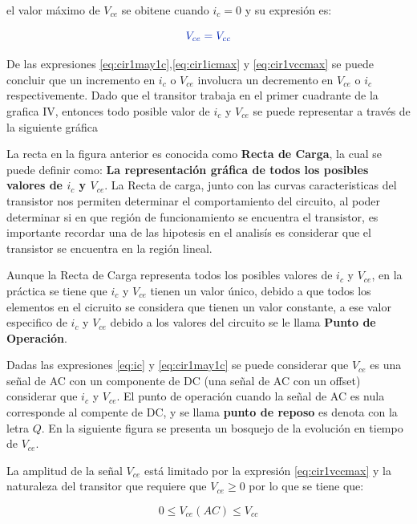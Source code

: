 \documentclass{article}
\begin{document}
el valor máximo de $V_{ce}$ se obitene cuando $i_{c}=0$ y su expresión
es:

\begin{equation}\label{eq:cir1vccmax}
\color{blue}{V_{ce}=V_{cc}}
\end{equation}

De las expresiones \eqref{eq:cir1may1c},\eqref{eq:cir1icmax} y
\eqref{eq:cir1vccmax} se puede concluir que un incremento en $i_{c}$ o
$V_{ce}$ involucra un decremento en $V_{ce}$ o $i_{c}$ respectivemente.
Dado que el transitor trabaja en el primer cuadrante de la grafica IV,
entonces todo posible valor de $i_{c}$ y $V_{ce}$ se puede representar a
través de la siguiente gráfica

La recta en la figura anterior es conocida como \textbf{Recta de Carga},
la cual se puede definir como: \textbf{La representación gráfica de
todos los posibles valores de $i_{c}$ y $V_{ce}$}. La Recta de carga,
junto con las curvas caracteristicas del transistor nos permiten
determinar el comportamiento del circuito, al poder determinar si en que
región de funcionamiento se encuentra el transistor, es importante
recordar una de las hipotesis en el analisís es considerar que el
transistor se encuentra en la región lineal.

Aunque la Recta de Carga representa todos los posibles valores de
$i_{c}$ y $V_{ce}$, en la práctica se tiene que $i_{c}$ y $V_{ce}$
tienen un valor único, debido a que todos los elementos en el cicruito
se considera que tienen un valor constante, a ese valor especifico de
$i_{c}$ y $V_{ce}$ debido a los valores del circuito se le llama
\textbf{Punto de Operación}.

Dadas las expresiones \eqref{eq:ic} y \eqref{eq:cir1may1c} se puede
considerar que $V_{ce}$ es una señal de AC con un componente de DC (una
señal de AC con un offset) considerar que $i_{c}$ y $V_{ce}$. El punto
de operación cuando la señal de AC es nula corresponde al compente de
DC, y se llama \textbf{punto de reposo} es denota con la letra $Q$. En
la siguiente figura se presenta un bosquejo de la evolución en tiempo de
$V_{ce}$.

La amplitud de la señal $V_{ce}$ está limitado por la expresión
\eqref{eq:cir1vccmax} y la naturaleza del transitor que requiere que
$V_{ce}\geq0$ por lo que se tiene que:

\begin{equation}\label{eq:vceac}
0\leq V_{ce}(AC) \leq V_{cc}
\end{equation}
\end{document}
